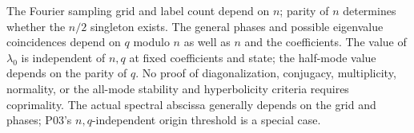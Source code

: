 The Fourier sampling grid and label count depend on $n$; parity of
$n$ determines whether the $n/2$ singleton exists. The general phases
and possible eigenvalue coincidences depend on $q$ modulo $n$ as
well as $n$ and the coefficients. The value of $\lambda_0$ is
independent of $n,q$ at fixed coefficients and state; the half-mode
value depends on the parity of $q$. No proof of diagonalization,
conjugacy, multiplicity, normality, or the all-mode stability and
hyperbolicity criteria requires coprimality. The actual spectral
abscissa generally depends on the grid and phases; P03's
$n,q$-independent origin threshold is a special case.
